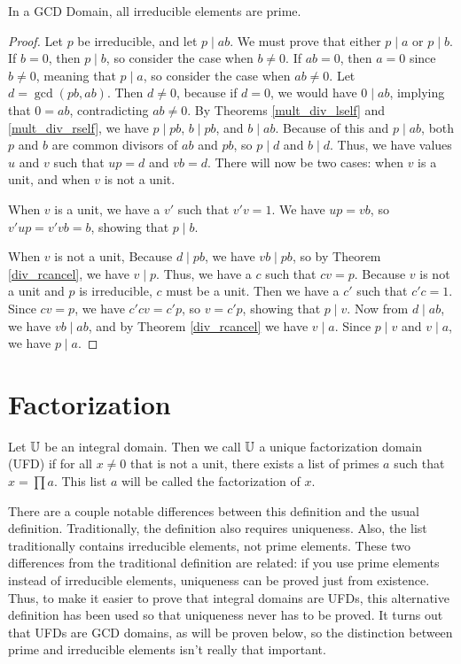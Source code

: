 \documentclass[../../math.tex]{subfiles}
\begin{document}
\begin{theorem} \label{irreducible_prime}
    In a GCD Domain, all irreducible elements are prime.
\end{theorem}
\begin{proof}
    Let $p$ be irreducible, and let $p \mid ab$.  We must prove that either $p
    \mid a$ or $p \mid b$.  If $b = 0$, then $p \mid b$, so consider the case
    when $b \neq 0$.  If $ab = 0$, then $a = 0$ since $b \neq 0$, meaning that
    $p \mid a$, so consider the case when $ab \neq 0$.  Let $d = \gcd(pb, ab)$.
    Then $d \neq 0$, because if $d = 0$, we would have $0 \mid ab$, implying
    that $0 = ab$, contradicting $ab \neq 0$.  By Theorems \ref{mult_div_lself}
    and \ref{mult_div_rself}, we have $p \mid pb$, $b \mid pb$, and $b \mid ab$.
    Because of this and $p \mid ab$, both $p$ and $b$ are common divisors of
    $ab$ and $pb$, so $p \mid d$ and $b \mid d$.  Thus, we have values $u$ and
    $v$ such that $up = d$ and $vb = d$.  There will now be two cases: when $v$
    is a unit, and when $v$ is not a unit.

    When $v$ is a unit, we have a $v'$ such that $v'v = 1$.  We have $up = vb$,
    so $v'up = v'vb = b$, showing that $p \mid b$.

    When $v$ is not a unit, Because $d \mid pb$, we have $vb \mid pb$, so by
    Theorem \ref{div_rcancel}, we have $v \mid p$.  Thus, we have a $c$ such
    that $cv = p$.  Because $v$ is not a unit and $p$ is irreducible, $c$ must
    be a unit.  Then we have a $c'$ such that $c'c = 1$.  Since $cv = p$, we
    have $c'cv = c'p$, so $v = c'p$, showing that $p \mid v$.  Now from $d \mid
    ab$, we have $vb \mid ab$, and by Theorem \ref{div_rcancel} we have $v \mid
    a$.  Since $p \mid v$ and $v \mid a$, we have $p \mid a$.
\end{proof}

\section{Factorization}

\begin{class}
    Let $\mathbb{U}$ be an integral domain.  Then we call $\mathbb{U}$ a unique factorization
    domain (UFD) if for all $x \neq 0$ that is not a unit, there exists a list
    of primes $a$ such that $x = \prod a$.  This list $a$ will be called the
    factorization of $x$.
\end{class}

There are a couple notable differences between this definition and the usual
definition.  Traditionally, the definition also requires uniqueness.  Also, the
list traditionally contains irreducible elements, not prime elements.  These two
differences from the traditional definition are related: if you use prime
elements instead of irreducible elements, uniqueness can be proved just from
existence.  Thus, to make it easier to prove that integral domains are UFDs,
this alternative definition has been used so that uniqueness never has to be
proved.  It turns out that UFDs are GCD domains, as will be proven below, so the
distinction between prime and irreducible elements isn't really that important.
\end{document}

